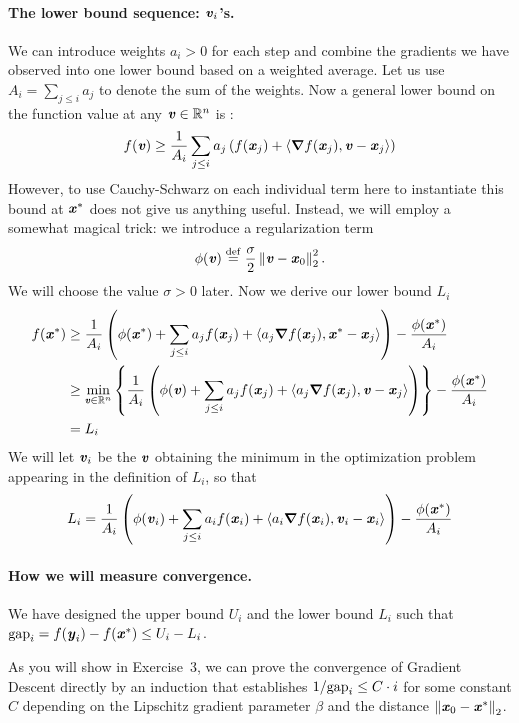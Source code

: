 \paragraph{The lower bound sequence: $\boldsymbol{\mathit{v}}_i$'s.}
We can introduce weights $a_i > 0$ for each step and combine the
gradients we have observed into one lower bound based on a weighted
average. Let us use $A_i = \sum_{j \leq i} a_j$ to denote the sum of
the weights. Now a general lower bound on the function value at any
$\boldsymbol{\mathit{v}} \in \mathbb{R}^n$ is
:
\[
  f(\boldsymbol{\mathit{v}})
  \geq
  \frac{1}{A_i}
  \sum_{j \leq i} a_j \left(  f(\boldsymbol{\mathit{x}}_j)
    + \left< \boldsymbol{\nabla}
      f(\boldsymbol{\mathit{x}}_j) , \boldsymbol{\mathit{v}} - \boldsymbol{\mathit{x}}_j \right>
    \right)
  \]
 However, to use Cauchy-Schwarz on each individual term here to
 instantiate this bound at $\boldsymbol{\mathit{x}}^*$ does not give us anything useful.
 Instead, we will employ a somewhat magical trick: we introduce a
 regularization term
 \[
   \phi(\boldsymbol{\mathit{v}}) \stackrel{\mathrm{def}}{=} \frac{\sigma}{2} \left\|  \boldsymbol{\mathit{v}} -
     \boldsymbol{\mathit{x}}_0 \right\|_2^2
   .
 \]
 We will choose the value $\sigma > 0$ later.
 Now  we derive our lower bound $L_i$
 \begin{align*}
  f(\boldsymbol{\mathit{x}}^*)
  &\geq
    \frac{1}{A_i}
     \left(
\phi(\boldsymbol{\mathit{x}}^*)
  +
  \sum_{j \leq i} a_j  f(\boldsymbol{\mathit{x}}_j)
    + \left<  a_j\boldsymbol{\nabla}
      f(\boldsymbol{\mathit{x}}_j) , \boldsymbol{\mathit{x}}^* - \boldsymbol{\mathit{x}}_j \right>
 \right)
  -
 \frac{\phi(\boldsymbol{\mathit{x}}^*)}{A_i}
    \\
   &\geq
     \min_{\boldsymbol{\mathit{v}} \in \mathbb{R}^n} \left\{
    \frac{1}{A_i}
     \left(
\phi(\boldsymbol{\mathit{v}})
  +
  \sum_{j \leq i} a_j  f(\boldsymbol{\mathit{x}}_j)
    + \left<  a_j\boldsymbol{\nabla}
      f(\boldsymbol{\mathit{x}}_{j}) ,\boldsymbol{\mathit{v}} - \boldsymbol{\mathit{x}}_j \right>
  \right)
      \right\}
     -
     \frac{\phi(\boldsymbol{\mathit{x}}^*)}{A_i}
   \\
   &= L_i
 \end{align*}
 We will let $\boldsymbol{\mathit{v}}_i$ be the $\boldsymbol{\mathit{v}}$ obtaining the minimum in the
 optimization problem appearing in the definition of $L_i$, so that
 \[
   L_i
   =
   \frac{1}{A_i}
   \left(
     \phi(\boldsymbol{\mathit{v}}_i)
     +
     \sum_{j \leq i} a_i  f(\boldsymbol{\mathit{x}}_i)
     + \left<  a_i\boldsymbol{\nabla}
       f(\boldsymbol{\mathit{x}}_{i}) ,\boldsymbol{\mathit{v}}_i - \boldsymbol{\mathit{x}}_i \right>
   \right)
   -
   \frac{\phi(\boldsymbol{\mathit{x}}^*)}{A_i}
\]
\paragraph{How we will measure convergence.}
We have designed the upper bound $U_i$ and the lower bound $L_i$ such
that $\text{gap}_i = f(\boldsymbol{\mathit{y}}_i)-f(\boldsymbol{\mathit{x}}^*) \leq U_i - L_i$.

As you will show in Exercise~3, we can prove the
convergence of Gradient Descent directly by an induction that
establishes $1/\text{gap}_i \leq C \cdot i $ for some constant $C$ depending
on the Lipschitz gradient parameter $\beta$ and the distance $\left\| \boldsymbol{\mathit{x}}_0
  - \boldsymbol{\mathit{x}}^* \right\|_2$.

